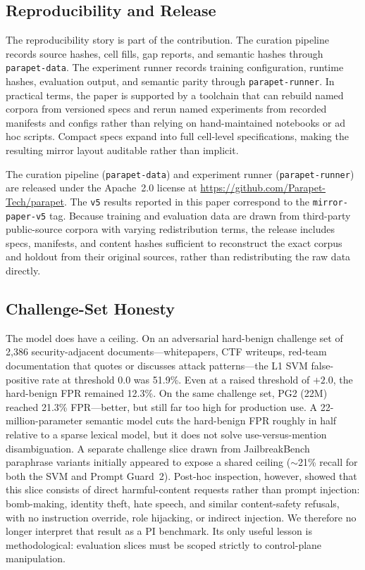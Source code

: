 \documentclass[11pt,a4paper]{article}
\begin{document}
\subsection{Reproducibility and Release}
\label{sec:repro}

The reproducibility story is part of the contribution. The curation
pipeline records source hashes, cell fills, gap reports, and semantic
hashes through \texttt{parapet-data}. The experiment runner records
training configuration, runtime hashes, evaluation output, and semantic
parity through \texttt{parapet-runner}. In practical terms, the paper is
supported by a toolchain that can rebuild named corpora from versioned
specs and rerun named experiments from recorded manifests and configs
rather than relying on hand-maintained notebooks or ad hoc scripts.
Compact specs expand into full cell-level specifications, making the
resulting mirror layout auditable rather than implicit.

The curation pipeline (\texttt{parapet-data}) and experiment runner
(\texttt{parapet-runner}) are released under the Apache~2.0 license at
\url{https://github.com/Parapet-Tech/parapet}. The \texttt{v5} results
reported in this paper correspond to the \texttt{mirror-paper-v5} tag.
Because training and evaluation data are drawn from third-party
public-source corpora with varying redistribution terms, the release
includes specs, manifests, and content hashes sufficient to reconstruct
the exact corpus and holdout from their original sources, rather than
redistributing the raw data directly.

\subsection{Challenge-Set Honesty}
\label{sec:challenge}

The model does have a ceiling. On an adversarial hard-benign challenge
set of 2,386 security-adjacent documents---whitepapers, CTF writeups,
red-team documentation that quotes or discusses attack patterns---the L1
SVM false-positive rate at threshold 0.0 was 51.9\%. Even at a raised
threshold of $+2.0$, the hard-benign FPR remained 12.3\%. On the same
challenge set, PG2 (22M) reached 21.3\% FPR---better, but still far too
high for production use. A 22-million-parameter semantic model cuts the
hard-benign FPR roughly in half relative to a sparse lexical model, but
it does not solve use-versus-mention disambiguation.
A separate challenge slice drawn from
JailbreakBench~\cite{jailbreakbench} paraphrase variants initially
appeared to expose a shared ceiling ($\sim$21\% recall for both the SVM
and Prompt Guard~2). Post-hoc inspection, however, showed that this
slice consists of direct harmful-content requests rather than prompt
injection: bomb-making, identity theft, hate speech, and similar
content-safety refusals, with no instruction override, role hijacking,
or indirect injection. We therefore no longer interpret that result as a
PI benchmark. Its only useful lesson is methodological: evaluation
slices must be scoped strictly to control-plane manipulation.
\end{document}
